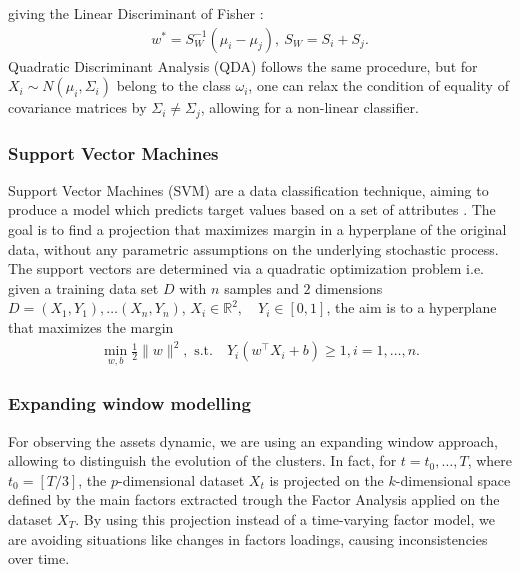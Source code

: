 giving the Linear Discriminant of Fisher \citep{FISHER.1936}:
  \begin{align}
  w^\ast=S_W^{-1}(\mu_i-\mu_j),\ S_W=S_i+S_j.
  \end{align}
Quadratic Discriminant Analysis (QDA) follows the same procedure, but for $X_i\sim N(\mu_i,\Sigma_i)$ belong to the class $\omega_i$, one can relax the condition of equality of covariance matrices by $\Sigma_i\neq\Sigma_j$, allowing for a non-linear classifier.

\subsubsection{Support Vector Machines}

Support Vector Machines (SVM) are a data classification technique, aiming to produce a model which predicts target values based on a set of attributes \citep{Cristianini.2000}. The goal is to find a projection that maximizes margin in a hyperplane of the original data, without any parametric assumptions on the underlying stochastic process. The support vectors are determined via a quadratic optimization problem i.e. given a training data set $D$ with $n$ samples and $2$ dimensions $D=\left(X_{1}, Y_{1}\right), \ldots \left(X_{n}, Y_{n}\right)$, $X_{i} \in \mathbb{R}^{2}, \quad Y_{i} \in[0,1]$, the aim is to  a hyperplane that maximizes the margin
\begin{align}
\min _{w, b} \frac{1}{2}\|w\|^{2},
\text{ s.t.} \quad Y_{i}\left(w^{\top} X_{i}+b\right) \geq 1, i=1, \ldots, n.
\end{align}

\subsubsection{Expanding window modelling}
For observing the assets dynamic, we are using an expanding window approach, allowing to distinguish the evolution of the clusters.
In fact, for $t=t_0,\ldots,T$, where $t_0=[T/3]$, the $p$-dimensional dataset $X_t$ is projected on the $k$-dimensional space defined by the main factors extracted trough the Factor Analysis applied on the dataset $X_T$. By using this projection instead of a time-varying factor model, we are avoiding situations like changes in factors loadings, causing inconsistencies over time. 